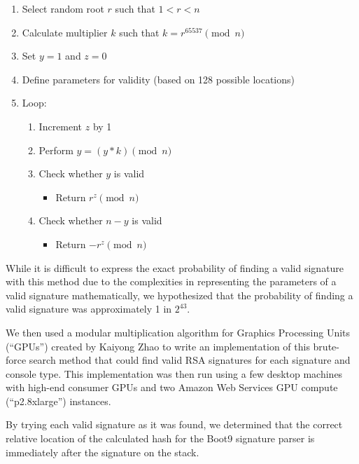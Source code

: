 \documentclass[journal]{IEEEtran}
\begin{document}
\medskip
\begin{enumerate}
  \item Select random root \(r\) such that \(1 < r < n\)
  \item Calculate multiplier \(k\) such that \(k = r^{65537} \pmod{n}\)
  \item Set \(y = 1\) and \(z = 0\)
  \item Define parameters for validity (based on 128 possible locations)
  \item Loop:
    \begin{enumerate}
      \item Increment \(z\) by 1
      \item Perform \(y = (y * k) \pmod{n}\)
      \item Check whether \(y\) is valid
        \begin{itemize}
          \item Return \(r^{z} \pmod{n}\)
        \end{itemize}
      \item Check whether \(n - y\) is valid
        \begin{itemize}
          \item Return \(-r^{z} \pmod{n}\)
        \end{itemize}
    \end{enumerate}
\end{enumerate}
\medskip

While it is difficult to express the exact probability of finding a valid
signature with this method due to the complexities in representing the
parameters of a valid signature mathematically, we hypothesized that the
probability of finding a valid signature was approximately 1 in \(2^{43}\).

We then used a modular multiplication algorithm for Graphics Processing Units
(``GPUs'') created by Kaiyong Zhao\cite{modmult} to write an implementation of
this brute-force search method that could find valid RSA signatures for each
signature and console type\cite{sighaxgpu}. This implementation was then run
using a few desktop machines with high-end consumer GPUs and two Amazon Web
Services GPU compute (``p2.8xlarge'') instances.

By trying each valid signature as it was found, we determined that the correct
relative location of the calculated hash for the Boot9 signature parser is
immediately after the signature on the stack.
\end{document}
